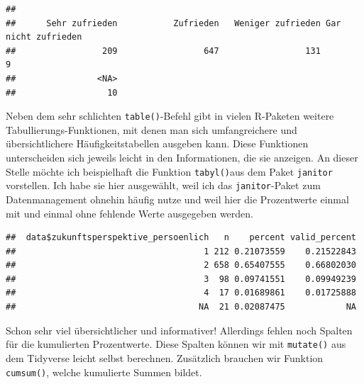 \documentclass[
]{book}
\newenvironment{Shaded}{\begin{snugshade}}{\end{snugshade}}
\newcommand{\AttributeTok}[1]{\textcolor[rgb]{0.77,0.63,0.00}{#1}}
\newcommand{\CommentTok}[1]{\textcolor[rgb]{0.56,0.35,0.01}{\textit{#1}}}
\newcommand{\FunctionTok}[1]{\textcolor[rgb]{0.00,0.00,0.00}{#1}}
\newcommand{\NormalTok}[1]{#1}
\newcommand{\SpecialCharTok}[1]{\textcolor[rgb]{0.00,0.00,0.00}{#1}}
\newcommand{\StringTok}[1]{\textcolor[rgb]{0.31,0.60,0.02}{#1}}
\begin{document}
\begin{Shaded}
\end{Shaded}

\begin{verbatim}
## 
##      Sehr zufrieden           Zufrieden   Weniger zufrieden Gar nicht zufrieden 
##                 209                 647                 131                   9 
##                <NA> 
##                  10
\end{verbatim}

Neben dem sehr schlichten \texttt{table()}-Befehl gibt in vielen R-Paketen weitere Tabullierungs-Funktionen, mit denen man sich umfangreichere und übersichtlichere Häufigkeitstabellen ausgeben kann. Diese Funktionen unterscheiden sich jeweils leicht in den Informationen, die sie anzeigen. An dieser Stelle möchte ich beispielhaft die Funktion \texttt{tabyl()}aus dem Paket \texttt{janitor} vorstellen. Ich habe sie hier ausgewählt, weil ich das \texttt{janitor}-Paket zum Datenmanagement ohnehin häufig nutze und weil hier die Prozentwerte einmal mit und einmal ohne fehlende Werte ausgegeben werden.

\begin{Shaded}
\end{Shaded}

\begin{verbatim}
##  data$zukunftsperspektive_persoenlich   n    percent valid_percent
##                                     1 212 0.21073559    0.21522843
##                                     2 658 0.65407555    0.66802030
##                                     3  98 0.09741551    0.09949239
##                                     4  17 0.01689861    0.01725888
##                                    NA  21 0.02087475            NA
\end{verbatim}

Schon sehr viel übersichtlicher und informativer! Allerdings fehlen noch Spalten für die kumulierten Prozentwerte. Diese Spalten können wir mit \texttt{mutate()} aus dem Tidyverse leicht selbst berechnen. Zusätzlich brauchen wir Funktion \texttt{cumsum()}, welche kumulierte Summen bildet.
\end{document}
